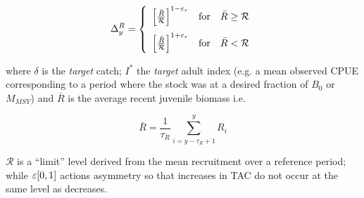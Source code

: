 \begin{equation} 
\Delta^R_y = \left\{\begin{array}{rcl}{\left[\frac{\bar{R}}{\mathcal{R}}\right]^{1-\varepsilon_r}} & \mbox{for} & \bar{R}\geq\mathcal{R}\\[0.35cm]
{\left[\frac{\bar{R}}{\mathcal{R}}\right]^{1+\varepsilon_r}} & \mbox{for} & \bar{R}<\mathcal{R}
\end{array}\right.
\end{equation}


where $\delta$ is the \textit{target} catch; $I^*$ the \textit{target} adult index (e.g. a mean observed CPUE corresponding to a period where the stock was at a desired fraction of $B_0$ or $M_{MSY}$) and 
$\bar{R}$ is the average recent juvenile biomass i.e.

\begin{equation}
    \bar{R}=\frac{1}{\tau_R}\sum\limits_{i=y-\tau_R+1}^{y}R_i
 \end{equation}

 
$\mathcal{R}$ is a ``limit'' level derived from the mean recruitment over a reference period; while $\varepsilon[0,1]$ actions asymmetry so that increases in TAC do not occur at the same level as decreases.


